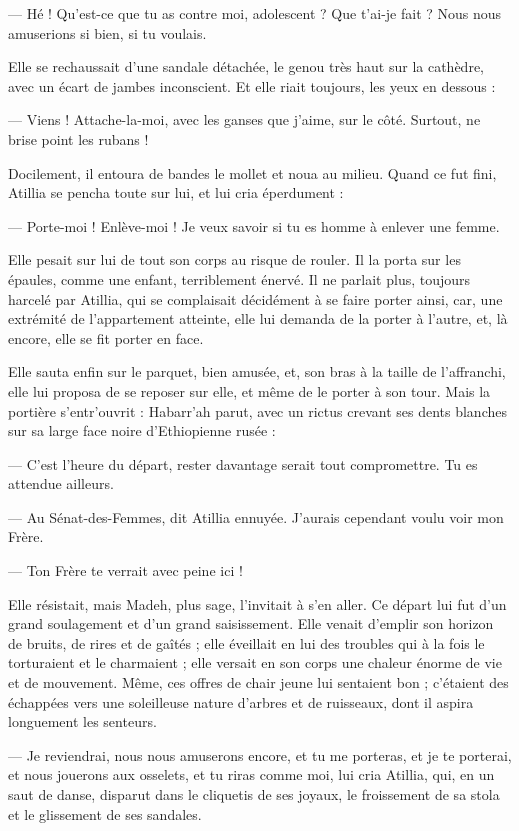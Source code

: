\documentclass[a4paper, 11pt, oneside, polutonikogreek, french]{article}
\begin{document}
--- Hé ! Qu'est-ce que tu as contre moi, adolescent ? Que t'ai-je fait ? Nous nous amuserions si bien, si tu voulais.

Elle se rechaussait d'une sandale détachée, le genou très haut sur la cathèdre, avec un écart de jambes inconscient. Et elle riait toujours, les yeux en dessous :

--- Viens ! Attache-la-moi, avec les ganses que j'aime, sur le côté. Surtout, ne brise point les rubans !

Docilement, il entoura de bandes le mollet et noua au milieu. Quand ce fut fini, Atillia se pencha toute sur lui, et lui cria éperdument :

--- Porte-moi ! Enlève-moi ! Je veux savoir si tu es homme à enlever une femme.

Elle pesait sur lui de tout son corps au risque de rouler. Il la porta sur les épaules, comme une enfant, terriblement énervé. Il ne parlait plus, toujours harcelé par Atillia, qui se complaisait décidément à se faire porter ainsi, car, une extrémité de l'appartement atteinte, elle lui demanda de la porter à l'autre, et, là encore, elle se fit porter en face.

Elle sauta enfin sur le parquet, bien amusée, et, son bras à la taille de l'affranchi, elle lui proposa de se reposer sur elle, et même de le porter à son tour. Mais la portière s'entr'ouvrit : Habarr'ah parut, avec un rictus crevant ses dents blanches sur sa large face noire d'Ethiopienne rusée :

--- C'est l'heure du départ, rester davantage serait tout compromettre. Tu es attendue ailleurs.

--- Au Sénat-des-Femmes, dit Atillia ennuyée. J'aurais cependant voulu voir mon Frère.

--- Ton Frère te verrait avec peine ici !

Elle résistait, mais Madeh, plus sage, l'invitait à s'en aller. Ce départ lui fut d'un grand soulagement et d'un grand saisissement. Elle venait d'emplir son horizon de bruits, de rires et de gaîtés ; elle éveillait en lui des troubles qui à la fois le torturaient et le charmaient ; elle versait en son corps une chaleur énorme de vie et de mouvement. Même, ces offres de chair jeune lui sentaient bon ; c'étaient des échappées vers une soleilleuse nature d'arbres et de ruisseaux, dont il aspira longuement les senteurs.

--- Je reviendrai, nous nous amuserons encore, et tu me porteras, et je te porterai, et nous jouerons aux osselets, et tu riras comme moi, lui cria Atillia, qui, en un saut de danse, disparut dans le cliquetis de ses joyaux, le froissement de sa stola et le glissement de ses sandales.
\end{document}

